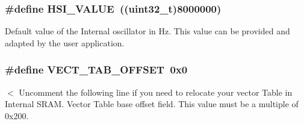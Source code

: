 \subsubsection[{H\+S\+I\+\_\+\+V\+A\+L\+U\+E}]{\setlength{\rightskip}{0pt plus 5cm}\#define H\+S\+I\+\_\+\+V\+A\+L\+U\+E~((uint32\+\_\+t)8000000)}\label{group___s_t_m32_f3xx___system___private___defines_gaaa8c76e274d0f6dd2cefb5d0b17fbc37}
Default value of the Internal oscillator in Hz. This value can be provided and adapted by the user application. \hypertarget{group___s_t_m32_f3xx___system___private___defines_ga40e1495541cbb4acbe3f1819bd87a9fe}{}
\subsubsection[{V\+E\+C\+T\+\_\+\+T\+A\+B\+\_\+\+O\+F\+F\+S\+E\+T}]{\setlength{\rightskip}{0pt plus 5cm}\#define V\+E\+C\+T\+\_\+\+T\+A\+B\+\_\+\+O\+F\+F\+S\+E\+T~0x0}\label{group___s_t_m32_f3xx___system___private___defines_ga40e1495541cbb4acbe3f1819bd87a9fe}
$<$ Uncomment the following line if you need to relocate your vector Table in Internal S\+R\+A\+M. Vector Table base offset field. This value must be a multiple of 0x200. 